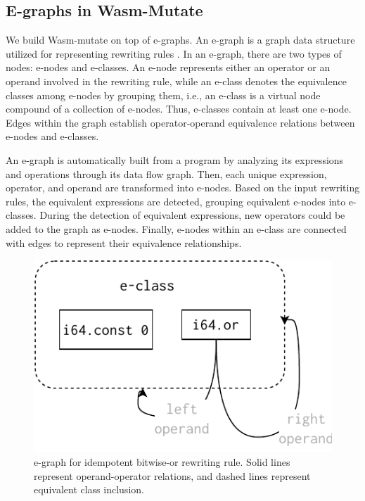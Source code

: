 \documentclass[sigplan,screen]{acmart}
\newcommand*\badge[1]{ \colorbox{red}{\color{white}#1}}
\newcommand{\tool}{Wasm-mutate\xspace}
\newcommand{\todo}[1]{%
\refstepcounter{todo}
\noindent\textbf{\badge{TODO}} {\color{red}#1}
\addcontentsline{td}{todo}
{\color{red}\thesection.\thetodo\xspace #1}}
\begin{document}

\subsection{E-graphs in Wasm-Mutate}
We build \tool on top of e-graphs.
An e-graph is a graph data structure utilized for representing rewriting rules \cite{10.1145/3571207}. 
In an e-graph, there are two types of nodes: e-nodes and e-classes. 
An e-node represents either an operator or an operand involved in the rewriting rule, while an e-class denotes the equivalence classes among e-nodes by grouping them, i.e., an e-class is a virtual node compound of a collection of e-nodes. 
Thus, e-classes contain at least one e-node.
Edges within the graph establish operator-operand equivalence relations between e-nodes and e-classes.

An e-graph is automatically built from a program by analyzing its expressions and operations through its data flow graph.
Then, each unique expression, operator, and operand are transformed into e-nodes.
Based on the input rewriting rules, the equivalent expressions are detected, grouping equivalent e-nodes into e-classes.
During the detection of equivalent expressions, new operators could be added to the graph as e-nodes.
Finally, e-nodes within an e-class are connected with edges to represent their equivalence relationships.

\begin{figure}
    \centering
    \includegraphics[width=0.7\linewidth]{figures/egraph1.pdf}
    \caption{e-graph for idempotent bitwise-or rewriting rule. Solid lines represent operand-operator relations, and dashed lines represent equivalent class inclusion. }
  \label{e-graph}
\end{figure}
\end{document}
